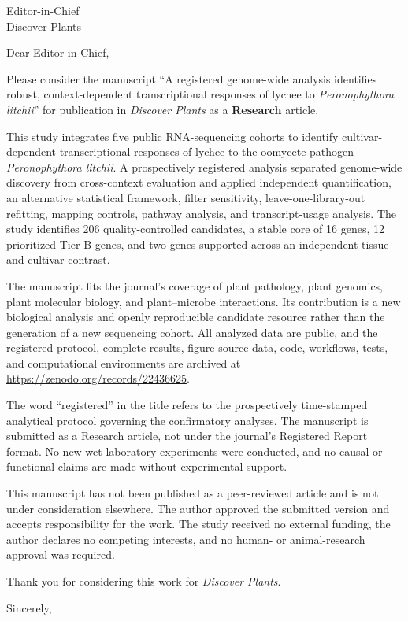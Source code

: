 \documentclass[11pt]{letter}
\begin{document}
\begin{letter}{Editor-in-Chief\\Discover Plants}
\opening{Dear Editor-in-Chief,}

Please consider the manuscript ``A registered genome-wide analysis identifies robust, context-dependent transcriptional responses of lychee to \textit{Peronophythora litchii}'' for publication in \textit{Discover Plants} as a \textbf{Research} article.

This study integrates five public RNA-sequencing cohorts to identify cultivar-dependent transcriptional responses of lychee to the oomycete pathogen \textit{Peronophythora litchii}. A prospectively registered analysis separated genome-wide discovery from cross-context evaluation and applied independent quantification, an alternative statistical framework, filter sensitivity, leave-one-library-out refitting, mapping controls, pathway analysis, and transcript-usage analysis. The study identifies 206 quality-controlled candidates, a stable core of 16 genes, 12 prioritized Tier B genes, and two genes supported across an independent tissue and cultivar contrast.

The manuscript fits the journal's coverage of plant pathology, plant genomics, plant molecular biology, and plant--microbe interactions. Its contribution is a new biological analysis and openly reproducible candidate resource rather than the generation of a new sequencing cohort. All analyzed data are public, and the registered protocol, complete results, figure source data, code, workflows, tests, and computational environments are archived at \url{https://zenodo.org/records/22436625}.

The word ``registered'' in the title refers to the prospectively time-stamped analytical protocol governing the confirmatory analyses. The manuscript is submitted as a Research article, not under the journal's Registered Report format. No new wet-laboratory experiments were conducted, and no causal or functional claims are made without experimental support.

This manuscript has not been published as a peer-reviewed article and is not under consideration elsewhere. The author approved the submitted version and accepts responsibility for the work. The study received no external funding, the author declares no competing interests, and no human- or animal-research approval was required.

Thank you for considering this work for \textit{Discover Plants}.

\closing{Sincerely,}
\end{letter}
\end{document}
